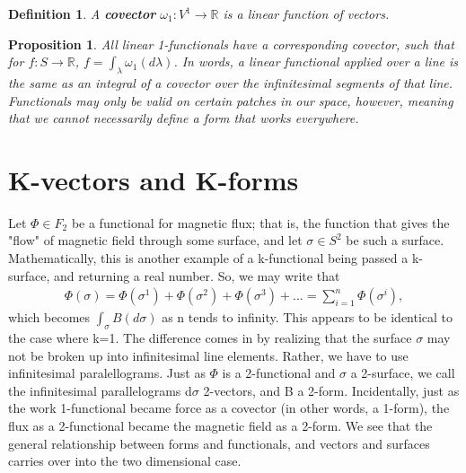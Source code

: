 \documentclass{book}
\newtheorem{defn}[equation]{Definition}
\newtheorem{prop}[equation]{Proposition}
\begin{document}
\begin{defn}
	A \textbf{covector} $\omega_1 : V^1 \to \mathbb{R}$ is a linear function of vectors. 
\end{defn}





\begin{prop}
	All linear 1-functionals have a corresponding covector, such that for $f : S \to \mathbb{R}$, $f = \int_{\lambda} \omega_1(d\lambda)$. In words, a linear functional applied over a line is the same as an integral of a covector over the infinitesimal segments of that line. Functionals may only be valid on certain patches in our space, however, meaning that we cannot necessarily define a form that works everywhere. 
\end{prop}




\section{K-vectors and K-forms}

Let $\Phi \in F_2$ be a functional for magnetic flux; that is, the function that gives the "flow" of magnetic field through some surface, and let $\sigma \in S^2$ be such a surface. Mathematically, this is another example of a k-functional being passed a k-surface, and returning a real number. So, we may write that \begin{gather}\Phi(\sigma) = \Phi(\sigma^1) + \Phi(\sigma^2) + \Phi(\sigma^3) + ... = \sum_{i=1}^n \Phi(\sigma^i),\end{gather} which becomes $\int_\sigma B(d\sigma)$ as n tends to infinity. This appears to be identical to the case where k=1. The difference comes in by realizing that the surface $\sigma$ may not be broken up into infinitesimal line elements. Rather, we have to use infinitesimal paralellograms. Just as $\Phi$ is a 2-functional and $\sigma$ a 2-surface, we call the infinitesimal parallelograms d$\sigma$ 2-vectors, and B a 2-form. Incidentally, just as the work 1-functional became force as a covector (in other words, a 1-form), the flux as a 2-functional became the magnetic field as a 2-form. We see that the general relationship between forms and functionals, and vectors and surfaces carries over into the two dimensional case.  
\end{document}

